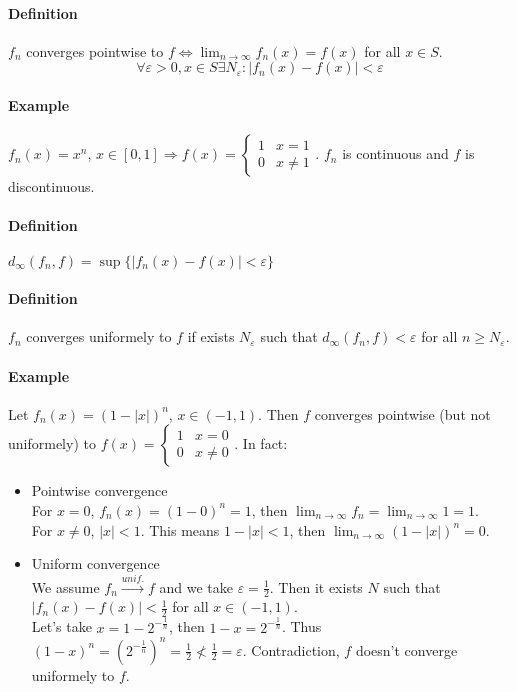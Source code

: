 \documentclass{article}
\newcommand{\DS}{\displaystyle}
\newcommand{\abs}[1]{\left|#1\right|}
\newcommand{\limn}{\lim_{n \to \infty}}
\newcommand{\tounif}{\xrightarrow{unif.}}
\newcommand{\intcc}[1]{\left[#1\right]}
\newcommand{\intoo}[1]{\left(#1\right)}
\newcommand{\Ep}{\varepsilon}
\newcommand{\Def}{\paragraph{Definition}}
\newcommand{\Example}{\paragraph{Example}}
\begin{document}
  \Def $f_n$ converges pointwise to $f \iff \DS \limn{f_n(x)} = f(x)$ for all
  $x \in S$.
\begin{equation*}
  \forall \Ep > 0, x \in S \exists N_\Ep : \abs{f_n(x) - f(x)} < \Ep
\end{equation*}

  \Example $f_n(x) = x^n$, $x \in \intcc{0,1} \Rightarrow f(x) =
  \begin{cases}1 & x = 1 \\ 0 & x \neq 1\end{cases}$. $f_n$ is continuous and
  $f$ is discontinuous.

  \Def $d_\infty(f_n,f) = \sup \{ \abs{f_n(x) - f(x)} < \Ep \}$

  \Def $f_n$ converges uniformely to $f$ if exists $N_\Ep$ such that
  $d_\infty(f_n,f) < \Ep$ for all $n \geq N_\Ep$.

  \Example Let $f_n(x) = (1 - \abs{x})^n$, $x \in \intoo{-1,1}$. Then $f$
  converges pointwise (but not uniformely) to $f(x) =
  \begin{cases}1 & x = 0 \\ 0 & x \neq 0\end{cases}$. In fact:
\begin{itemize}
  \item Pointwise convergence
\\For $x = 0$, $f_n(x) = (1 - 0)^n = 1$, then $\DS \limn{f_n} = \limn{1} = 1$.
\\For $x \neq 0$, $\abs{x} < 1$. This means $1 - |x| < 1$, then
  $\DS \limn{(1-|x|)^n} = 0$.

  \item Uniform convergence
\\We assume $f_n \tounif f$ and we take $\Ep = \frac{1}{2}$. Then it exists $N$
  such that $\abs{f_n(x) - f(x)} < \frac{1}{2}$ for all $x \in \intoo{-1,1}$.
\\Let's take $x = 1 - 2^{-\frac{1}{n}}$, then $1 - x = 2^{-\frac{1}{n}}$. Thus
  $(1 - x)^n = (2^{-\frac{1}{n}})^n = \frac{1}{2} \nless \frac{1}{2} = \Ep$.
  Contradiction, $f$ doesn't converge uniformely to $f$.
\end{itemize}
\end{document}
